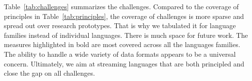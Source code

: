 Table~\ref{tab:challenges} summarizes the challenges.  Compared to the
coverage of principles in Table~\ref{tab:principles}, the coverage of
challenges is more sparse and spread out over research prototypes.
That is why we tabulated it for language families instead of
individual languages.  There is much space for future work. The
measures highlighted in bold are most covered across all the languages
families.  The ability to handle a wide variety of data formats
appears to be a universal concern.
Ultimately, we aim at streaming languages that are
both principled and close the gap on all challenges.
